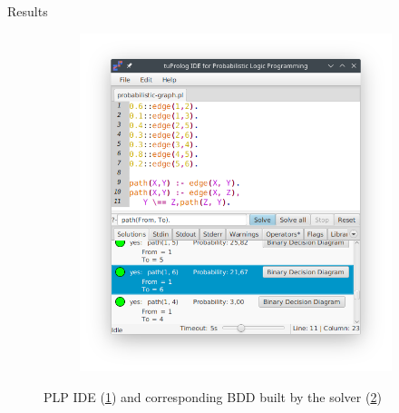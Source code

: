 \documentclass[presentation]{beamer}\mode<presentation>{\usetheme{AMSBolognaFC}}
\begin{document}
\begin{frame}[c, allowframebreaks]{Results}
    \begin{figure}
        \centering
        \begin{subfigure}{0.4\linewidth}
            \caption{}
            \label{fig:problog-ide:screenshot}
            \includegraphics[width=\linewidth]{img/valid-ide-screenshot.png}
        \end{subfigure}
        \hfill
        \begin{subfigure}{0.59\linewidth}
            \caption{}
            \label{fig:problog-ide:graph}
        \end{subfigure}
        \caption{\twopkt{} PLP IDE (\ref{fig:problog-ide:screenshot}) and corresponding BDD built by the solver (\ref{fig:problog-ide:graph})}
        \label{fig:problog-ide}
    \end{figure}


\end{frame}
\end{document}
